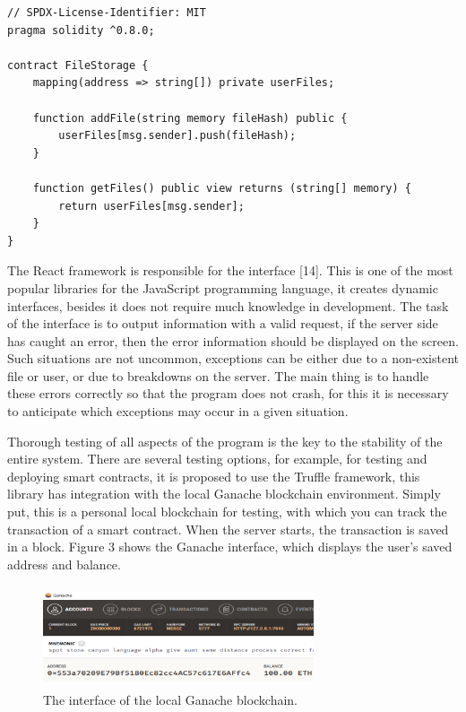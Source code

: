\documentclass[10pt,conference,a4paper]{IEEEtran_EDM}
\begin{document}


\begin{lstlisting}[caption=Solidity code for a smart contract]
// SPDX-License-Identifier: MIT
pragma solidity ^0.8.0;

contract FileStorage {
    mapping(address => string[]) private userFiles;

    function addFile(string memory fileHash) public {
        userFiles[msg.sender].push(fileHash);
    }

    function getFiles() public view returns (string[] memory) {
        return userFiles[msg.sender];
    }
}
\end{lstlisting}

The React framework is responsible for the interface [14]. This is one of the most popular libraries for the JavaScript programming language, it creates dynamic interfaces, besides it does not require much knowledge in development. The task of the interface is to output information with a valid request, if the server side has caught an error, then the error information should be displayed on the screen. Such situations are not uncommon, exceptions can be either due to a non-existent file or user, or due to breakdowns on the server. The main thing is to handle these errors correctly so that the program does not crash, for this it is necessary to anticipate which exceptions may occur in a given situation.

Thorough testing of all aspects of the program is the key to the stability of the entire system. There are several testing options, for example, for testing and deploying smart contracts, it is proposed to use the Truffle framework, this library has integration with the local Ganache blockchain environment. Simply put, this is a personal local blockchain for testing, with which you can track the transaction of a smart contract. When the server starts, the transaction is saved in a block. Figure 3 shows the Ganache interface, which displays the user's saved address and balance.



\begin{figure}[htbp]
\includegraphics[width=8cm, height=3cm]{fig3.png}
\caption{The interface of the local Ganache blockchain.}
\label{fig}
\end{figure}
\end{document}
